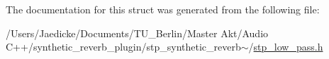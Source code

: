 The documentation for this struct was generated from the following file\+:\begin{DoxyCompactItemize}
\item 
/\+Users/\+Jaedicke/\+Documents/\+T\+U\+\_\+\+Berlin/\+Master Akt/\+Audio C++/synthetic\+\_\+reverb\+\_\+plugin/stp\+\_\+synthetic\+\_\+reverb$\sim$/\hyperlink{stp__low__pass_8h}{stp\+\_\+low\+\_\+pass.\+h}\end{DoxyCompactItemize}
